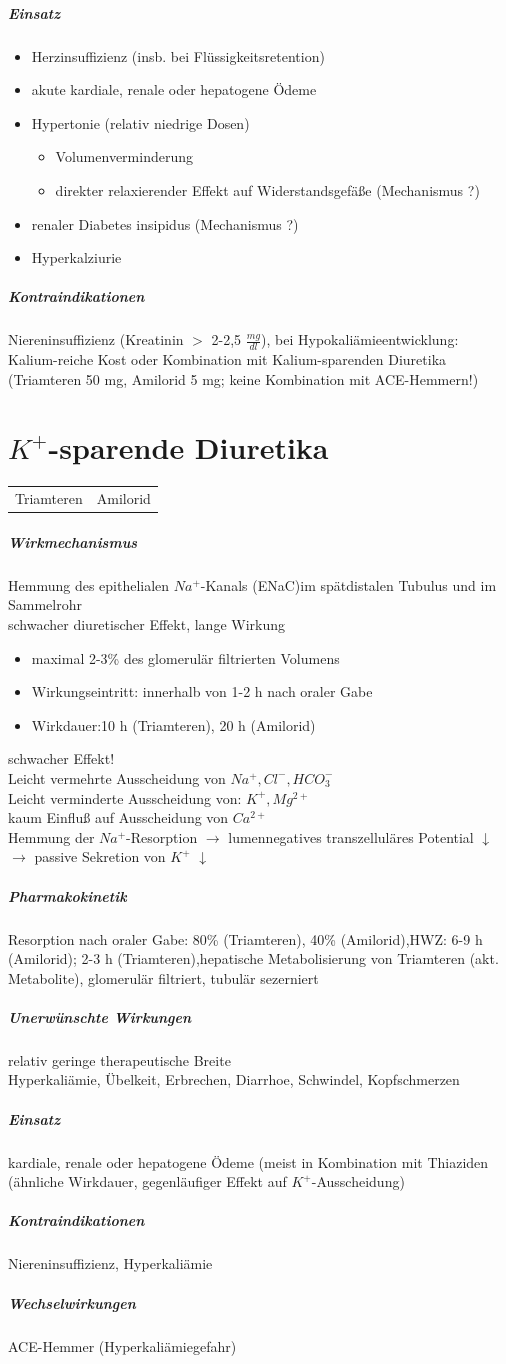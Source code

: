 \documentclass[10pt,a4paper]{report}
\begin{document}
\subparagraph{Einsatz}
\begin{itemize}
	\item Herzinsuffizienz (insb. bei Flüssigkeitsretention)
	\item akute kardiale, renale oder hepatogene Ödeme
	\item Hypertonie (relativ niedrige Dosen)
	\begin{itemize}
		\item Volumenverminderung
		\item direkter relaxierender Effekt auf Widerstandsgefäße (Mechanismus ?)
	\end{itemize}		
	\item renaler Diabetes insipidus (Mechanismus ?)
	\item Hyperkalziurie
\end{itemize}
\subparagraph{Kontraindikationen}Niereninsuffizienz (Kreatinin $>$ 2-2,5 $\frac{mg}{dl}$), bei Hypokaliämieentwicklung: Kalium-reiche Kost oder Kombination mit Kalium-sparenden Diuretika (Triamteren 50 mg, Amilorid 5 mg; keine Kombination mit ACE-Hemmern!)
\section{$K^+$-sparende Diuretika}
\begin{tabularx}{\textwidth}{XX}
Triamteren&Amilorid\\
\end{tabularx}
\subparagraph{Wirkmechanismus}
Hemmung des epithelialen $Na^+$-Kanals (ENaC)im spätdistalen Tubulus und im Sammelrohr\\
schwacher diuretischer Effekt, lange Wirkung
\begin{itemize}
	\item maximal 2-3\% des glomerulär filtrierten Volumens
	\item Wirkungseintritt: innerhalb von 1-2 h nach oraler Gabe
	\item Wirkdauer:10 h (Triamteren), 20 h (Amilorid)
\end{itemize}
schwacher Effekt!
\\
Leicht vermehrte Ausscheidung von $Na^+, Cl^-, HCO_3^-$\\ 
Leicht verminderte Ausscheidung von: $K^+, Mg^{2+}$\\
kaum Einfluß auf Ausscheidung von $Ca^{2+}$\\
Hemmung der $Na^+$-Resorption $\rightarrow$ lumennegatives transzelluläres Potential $\downarrow$ $\rightarrow$ passive Sekretion von $K^+$ $\downarrow$
\subparagraph{Pharmakokinetik}Resorption nach oraler Gabe: 80\% (Triamteren), 40\% (Amilorid),HWZ: 6-9 h (Amilorid); 2-3 h (Triamteren),hepatische Metabolisierung von Triamteren (akt. Metabolite), glomerulär filtriert, tubulär sezerniert
\subparagraph{Unerwünschte Wirkungen}relativ geringe therapeutische Breite\\
Hyperkaliämie, Übelkeit, Erbrechen, Diarrhoe, Schwindel, Kopfschmerzen
\subparagraph{Einsatz}
kardiale, renale oder hepatogene Ödeme (meist in Kombination mit Thiaziden (ähnliche Wirkdauer, gegenläufiger Effekt auf $K^+$-Ausscheidung)
\subparagraph{Kontraindikationen}Niereninsuffizienz, Hyperkaliämie
\subparagraph{Wechselwirkungen}ACE-Hemmer (Hyperkaliämiegefahr)
\end{document}

